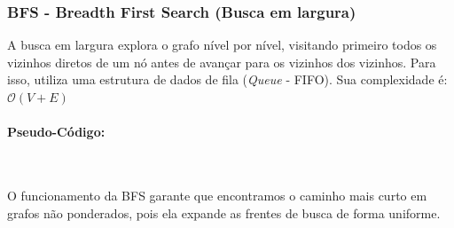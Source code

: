 \subsubsection{BFS - Breadth First Search (Busca em largura)}
A busca em largura explora o grafo nível por nível, visitando primeiro todos os
vizinhos diretos de um nó antes de avançar para os vizinhos dos vizinhos. Para
isso, utiliza uma estrutura de dados de fila (\textit{Queue} - FIFO). Sua complexidade é: $\mathcal{O}(V+E)$

\paragraph{Pseudo-Código: }\mbox{}\\
\begin{algorithm}[H]
	\SetAlgoLined


	\caption{Busca em Largura (BFS)}
\end{algorithm}

O funcionamento da BFS garante que encontramos o caminho mais curto em grafos
não ponderados, pois ela expande as frentes de busca de forma uniforme.

